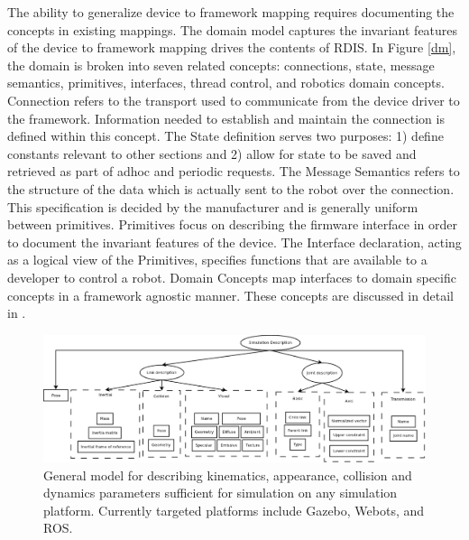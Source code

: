 The ability to generalize device to framework mapping requires documenting the concepts in existing mappings.  The domain model captures the invariant features of the device to framework mapping drives the contents of RDIS.  In Figure \ref{dm}, the domain is broken into seven related concepts: connections, state, message semantics, primitives, interfaces, thread control, and robotics domain concepts.  {\sc Connection} refers to the transport used to communicate from the device driver to the framework.  Information needed to establish and maintain the connection is defined within this concept. The {\sc State} definition serves two purposes: 1) define constants relevant to other sections and 2) allow for state to be saved and retrieved as part of adhoc and periodic requests.   The {\sc Message Semantics} refers to the structure of the data which is actually sent to the robot over the connection. This specification is decided by the manufacturer and is generally uniform between primitives.   {\sc Primitives} focus on describing the firmware interface in order to document the invariant features of the device.   The {\sc Interface} declaration, acting as a logical view of the {\sc Primitives},  specifies functions that are available to a developer to control a robot.   {\sc Domain Concepts} map interfaces to domain specific concepts in a framework agnostic manner.  These concepts are discussed in detail in \cite{Anderson2012}.

\begin{figure}[thpb]
      \centering
      \includegraphics[width=6in]{kvc.pdf}
      \caption{General model for describing kinematics, appearance, collision and dynamics parameters sufficient for simulation on any simulation platform.  Currently targeted platforms include Gazebo, Webots, and ROS.}
      \label{kvc}
\end{figure}



